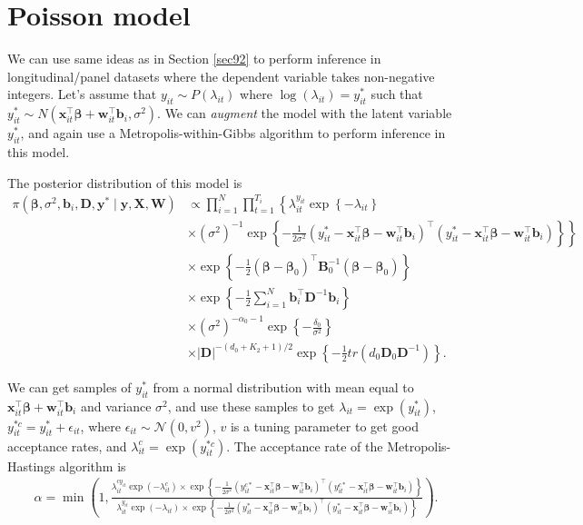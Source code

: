 \section{Poisson model}\label{sec93}

We can use same ideas as in Section \ref{sec92} to perform inference in longitudinal/panel datasets where the dependent variable takes non-negative integers. Let's assume that $y_{it}\sim P(\lambda_{it})$ where $\log(\lambda_{it})=y_{it}^*$ such that $y_{it}^*\sim N(\bm{x}_{it}^{\top}\bm{\beta}+\bm{w}_{it}^{\top}\bm{b}_i,\sigma^2)$. We can \textit{augment} the model with the latent variable $y_{it}^{*}$, and again use a Metropolis-within-Gibbs algorithm to perform inference in this model.

The posterior distribution of this model is
\begin{align*}
	\pi(\bm{\beta},\sigma^2, \bm{b}_i, \bm{D}, \bm{y}^*\mid \bm{y}, \bm{X}, \bm{W})&\propto \prod_{i=1}^N \prod_{t=1}^{T_i}\left\{\lambda_{it}^{y_{it}}\exp\left\{-\lambda_{it}\right\}\right.\\
	&\left.\times (\sigma^2)^{-1}\exp\left\{-\frac{1}{2\sigma^2}(y_{it}^*-\bm{x}_{it}^{\top}\bm{\beta}-\bm{w}_{it}^{\top}\bm{b}_i)^{\top}(y_{it}^*-\bm{x}_{it}^{\top}\bm{\beta}-\bm{w}_{it}^{\top}\bm{b}_i)\right\}\right\}\\
	&\times \exp\left\{-\frac{1}{2}(\bm{\beta}-\bm{\beta}_0)^{\top}\bm{B}_0^{-1}(\bm{\beta}-\bm{\beta}_0)\right\}\\
	&\times \exp\left\{-\frac{1}{2}\sum_{i=1}^N \bm{b}_i^{\top}\bm{D}^{-1}\bm{b}_i\right\}\\
	&\times (\sigma^2)^{-\alpha_0-1}\exp\left\{-\frac{\delta_0}{\sigma^2}\right\}\\
	&\times |\bm{D}|^{-(d_0+K_2+1)/2}\exp\left\{-\frac{1}{2}tr(d_0\bm{D}_0\bm{D}^{-1})\right\}.	
\end{align*}

We can get samples of $y_{it}^*$ from a normal distribution with mean equal to $\bm{x}_{it}^{\top}\bm{\beta}+\bm{w}_{it}^{\top}\bm{b}_i$ and variance $\sigma^2$, and use these samples to get $\lambda_{it}=\exp(y_{it}^*)$, $y_{it}^{*c}=y_{it}^{*}+\epsilon_{it}$, where $\epsilon_{it}\sim\mathcal{N}(0,v^2)$, $v$ is a tuning parameter to get good acceptance rates, and $\lambda_{it}^c=\exp(y_{it}^{*c})$. The acceptance rate of the Metropolis-Hastings algorithm is 
{\footnotesize
	\begin{align*}
		\alpha=\min\left(1,\frac{ \lambda_{it}^{cy_{it}}\exp(-\lambda_{it}^c)\times\exp\left\{-\frac{1}{2\sigma^2}(y_{it}^{c*}-\bm{x}_{it}^{\top}\bm{\beta}-\bm{w}_{it}^{\top}\bm{b}_i)^{\top}(y_{it}^{c*}-\bm{x}_{it}^{\top}\bm{\beta}-\bm{w}_{it}^{\top}\bm{b}_i)\right\}}{\lambda_{it}^{y_{it}}\exp(-\lambda_{it})\times\exp\left\{-\frac{1}{2\sigma^2}(y_{it}^{*}-\bm{x}_{it}^{\top}\bm{\beta}-\bm{w}_{it}^{\top}\bm{b}_i)^{\top}(y_{it}^{*}-\bm{x}_{it}^{\top}\bm{\beta}-\bm{w}_{it}^{\top}\bm{b}_i)\right\}}\right).
	\end{align*}
}

